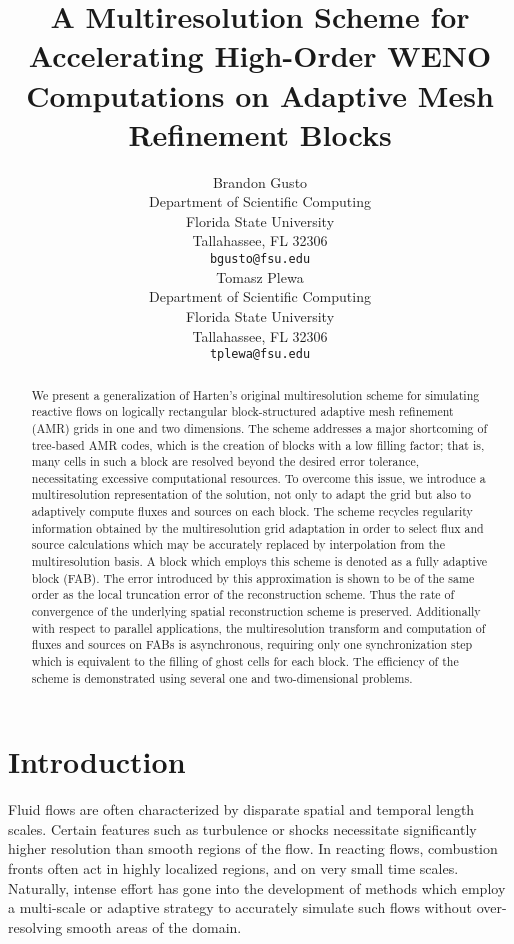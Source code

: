 \documentclass[12pt,letterpaper]{article}
\title{A Multiresolution Scheme for Accelerating High-Order WENO Computations on Adaptive Mesh Refinement Blocks}
\author{
  Brandon Gusto\\
  Department of Scientific Computing\\
  Florida State University\\
  Tallahassee, FL 32306 \\
  \texttt{bgusto@fsu.edu} \\
  \And
  Tomasz Plewa \\
  Department of Scientific Computing\\
  Florida State University\\
  Tallahassee, FL 32306 \\
  \texttt{tplewa@fsu.edu} \\
}
\begin{document}
\maketitle

\begin{abstract}
    We present a generalization of Harten's original multiresolution scheme for
    simulating reactive flows on logically rectangular block-structured adaptive
    mesh refinement (AMR) grids in one and two dimensions. The scheme addresses
    a major shortcoming of tree-based AMR codes, which is the creation of blocks
    with a low filling factor; that is, many cells in such a block are resolved
    beyond the desired error tolerance, necessitating excessive computational
    resources.  To overcome this issue, we introduce a multiresolution
    representation of the solution, not only to adapt the grid but also to
    adaptively compute fluxes and sources on each block. The scheme recycles
    regularity information obtained by the multiresolution grid adaptation in
    order to select flux and source calculations which may be accurately
    replaced by interpolation from the multiresolution basis. A block which
    employs this scheme is denoted as a fully adaptive block (FAB).  The error
    introduced by this approximation is shown to be of the same order as the
    local truncation error of the reconstruction scheme. Thus the rate of
    convergence of the underlying spatial reconstruction scheme is preserved.
    Additionally with respect to parallel applications, the multiresolution
    transform and computation of fluxes and sources on FABs is asynchronous,
    requiring only one synchronization step which is equivalent to the filling
    of ghost cells for each block. The efficiency of the scheme is demonstrated
    using several one and two-dimensional problems.
\end{abstract}


\section{Introduction}

    Fluid flows are often characterized by disparate spatial and temporal length
    scales. Certain features such as turbulence or shocks necessitate
    significantly higher resolution than smooth regions of the flow.  In
    reacting flows, combustion fronts often act in highly localized regions, and
    on very small time scales. Naturally, intense effort has gone into the
    development of methods which employ a multi-scale or adaptive strategy to
    accurately simulate such flows without over-resolving smooth areas of the
    domain.
\end{document}
